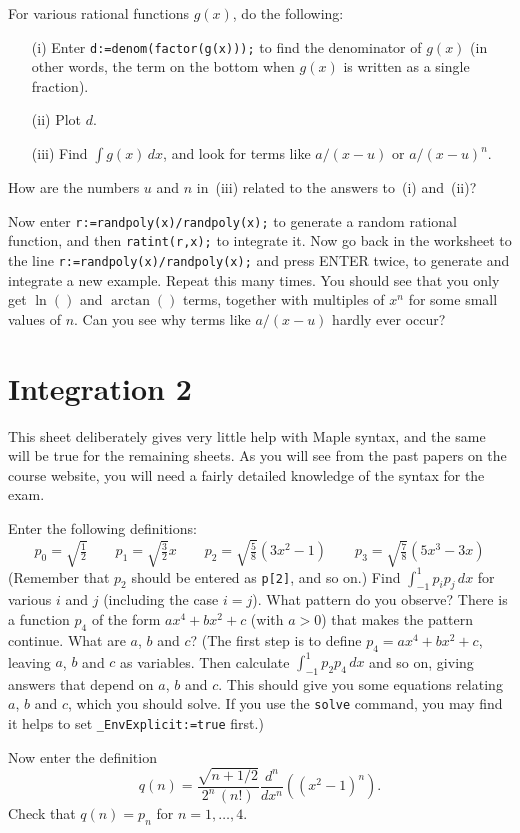 \documentclass[a4paper,10pt]{amsbook}
\numberwithin{example}{chapter}
\begin{document}
\begin{exercise}
 For various rational functions $g(x)$, do the following:
 \begin{itemize}
  \item[(i)] Enter \verb~d:=denom(factor(g(x)));~ to find
   the denominator of $g(x)$ (in other words, the term on
   the bottom when $g(x)$ is written as a single fraction).
  \item[(ii)] Plot $d$.
  \item[(iii)] Find $\int g(x)\,dx$, and look for terms like
   $a/(x-u)$ or $a/(x-u)^n$. 
 \end{itemize}
 How are the numbers $u$ and $n$ in~(iii) related to the
 answers to~(i) and~(ii)?
 
 Now enter \verb~r:=randpoly(x)/randpoly(x);~ to generate a
 random rational function, and then \verb~ratint(r,x);~ to
 integrate it.  Now go back in the worksheet to the line
 \verb~r:=randpoly(x)/randpoly(x);~ and press ENTER twice,
 to generate and integrate a new example.  Repeat this many
 times.  You should see that you only get $\ln()$ and
 $\arctan()$ terms, together with multiples of $x^n$ for
 some small values of $n$.  Can you see why terms like
 $a/(x-u)$ hardly ever occur?
\end{exercise}


\chapter{Integration 2}

This sheet deliberately gives very little help with Maple syntax, and
the same will be true for the remaining sheets.  As you will see from
the past papers on the course website, you will need a fairly detailed
knowledge of the syntax for the exam.

\begin{exercise}\label{ex-legendre}
 Enter the following definitions:
 \[
  p_0 = \sqrt{\tfrac{1}{2}}            \hspace{2em}
  p_1 = \sqrt{\tfrac{3}{2}} x          \hspace{2em}
  p_2 = \sqrt{\tfrac{5}{8}}(3x^2 - 1)  \hspace{2em}
  p_3 = \sqrt{\tfrac{7}{8}}(5x^3 - 3x)
 \]
 (Remember that $p_2$ should be entered as
 \verb~p[2]~, and so on.)  Find
 $\int_{-1}^1p_ip_j\,dx$ for various $i$ and $j$
 (including the case $i=j$).  What pattern do you observe?
 There is a function $p_4$ of the form $ax^4+bx^2+c$
 (with $a>0$) that makes the pattern continue.  What are
 $a$, $b$ and $c$?  (The first step is to define
 $p_4=ax^4+bx^2+c$, leaving $a$, $b$ and $c$ as
 variables.  Then calculate $\int_{-1}^1p_2p_4\, dx$
 and so on, giving answers that depend on $a$, $b$ and $c$.
 This should give you some equations relating $a$, $b$ and
 $c$, which you should solve.  If you use the \verb~solve~
 command, you may find it helps to set
 \verb~_EnvExplicit:=true~ first.)

 Now enter the definition
 \[ q(n) =
     \frac{\sqrt{n+1/2}}{2^n\,(n!)}
      \frac{d^n}{dx^n}\left((x^2-1)^n\right).
 \]
 Check that $q(n)=p_n$ for $n=1,\ldots,4$.
\end{exercise}
\end{document}
